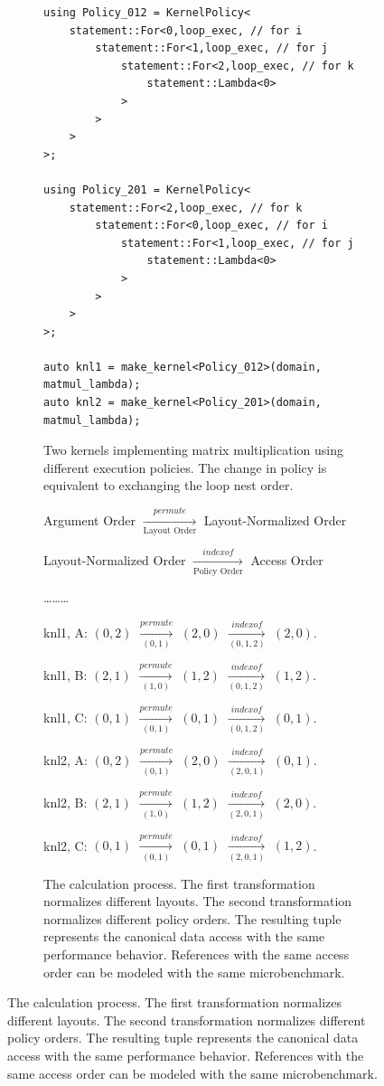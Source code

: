 \documentclass[sigconf,review=true]{acmart}
\begin{document}
\begin{figure}
\begin{subfigure}{0.40\textwidth}
\begin{lstlisting}
using Policy_012 = KernelPolicy< 
	statement::For<0,loop_exec, // for i
		statement::For<1,loop_exec, // for j
			statement::For<2,loop_exec, // for k
				statement::Lambda<0>
			>
		>
	>
>;

using Policy_201 = KernelPolicy< 
	statement::For<2,loop_exec, // for k
		statement::For<0,loop_exec, // for i
			statement::For<1,loop_exec, // for j
				statement::Lambda<0>
			>
		>
	>
>;

auto knl1 = make_kernel<Policy_012>(domain, matmul_lambda);
auto knl2 = make_kernel<Policy_201>(domain, matmul_lambda);
		\end{lstlisting}
		\caption{Two kernels implementing matrix multiplication using different execution policies. The change in policy is equivalent to exchanging the loop nest order.}
		\label{accessOrder:code}
	\end{subfigure}
	\hspace{0.02\textwidth}
	\begin{subfigure}{0.45\textwidth}
		\begin{center}
		Argument Order $\xrightarrow[\text{Layout Order}]{permute}$ Layout-Normalized Order

		Layout-Normalized Order $\xrightarrow[\text{Policy Order}]{indexof}$ Access Order

		\vspace{5px}
		\dots\dots\dots
		\vspace{5px}

		knl1, A: $(0,2)$ $\xrightarrow[(0,1)]{permute}$ $(2,0)$ $\xrightarrow[(0,1,2)]{indexof}$ $(2,0)$.
		
		knl1, B: $(2,1)$ $\xrightarrow[(1,0)]{permute}$ $(1,2)$ $\xrightarrow[(0,1,2)]{indexof}$ $(1,2)$.
		
		knl1, C: $(0,1)$ $\xrightarrow[(0,1)]{permute}$ $(0,1)$ $\xrightarrow[(0,1,2)]{indexof}$ $(0,1)$.
		
		knl2, A: $(0,2)$ $\xrightarrow[(0,1)]{permute}$ $(2,0)$ $\xrightarrow[(2,0,1)]{indexof}$ $(0,1)$.

		knl2, B: $(2,1)$ $\xrightarrow[(1,0)]{permute}$ $(1,2)$ $\xrightarrow[(2,0,1)]{indexof}$ $(2,0)$.

		knl2, C: $(0,1)$ $\xrightarrow[(0,1)]{permute}$ $(0,1)$ $\xrightarrow[(2,0,1)]{indexof}$ $(1,2)$.
	\end{center}
	\caption{The calculation process. The first transformation normalizes different layouts. The second transformation normalizes different policy orders. The resulting tuple represents the canonical data access with the same performance behavior. References with the same access order can be modeled with the same microbenchmark.}
	\label{accessOrder:calc}
	\end{subfigure}


\end{figure}
\end{document}
